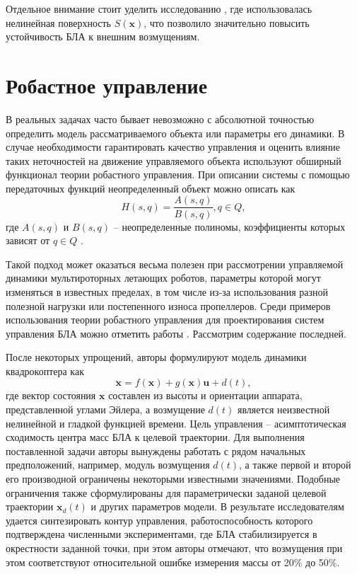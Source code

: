 Отдельное внимание стоит уделить исследованию \cite{Sumantri01}, где использовалась нелинейная поверхность $S(\bm x)$, что позволило значительно повысить устойчивость БЛА к внешним возмущениям.

\section{Робастное управление}

В реальных задачах часто бывает невозможно с абсолютной точностью определить модель рассматриваемого объекта или параметры его динамики.
В случае необходимости гарантировать качество управления и оценить влияние таких неточностей на движение управляемого объекта используют обширный функционал теории робастного управления.
При описании системы с помощью передаточных функций неопределенный объект можно описать как
\begin{equation} \label{eq:robust_ctrl_obj}
H(s, q) = \frac{A(s, q)}{B(s, q)}, q \in Q,
\end{equation}
где $A(s, q)$ и $B(s, q)$ -- неопределенные полиномы, коэффициенты которых зависят от $q \in Q$ \cite{Polyak01}. 

Такой подход может оказаться весьма полезен при рассмотрении управляемой динамики
мультироторных летающих роботов, параметры которой могут изменяться в известных пределах, в том числе из-за использования разной полезной нагрузки или постепенного износа пропеллеров. Среди примеров использования теории робастного управления для проектирования систем управления БЛА можно отметить работы \cite{Lee02, Borisov01, Petranevsky01, Bai01, Tony01}. Рассмотрим содержание последней.

После некоторых упрощений, авторы формулируют модель динамики квадрокоптера как 
\begin{equation} \label{eq:Tony_dyn}
\ddot{\bm x} = f(\bm x) + g( \bm x) \bm u + d(t),
\end{equation}
где вектор состояния $\bm x$ составлен из высоты и ориентации аппарата, представленной углами Эйлера, а возмущение $d(t)$ является неизвестной нелинейной и гладкой функцией времени. Цель управления -- асимптотическая сходимость центра масс БЛА к целевой траектории. Для выполнения поставленной задачи авторы вынуждены работать с рядом начальных предположений, например, модуль возмущения $d(t)$, а также первой и второй его производной ограничены некоторыми известными значениями. Подобные ограничения также сформулированы для параметрически заданой целевой траектории $\bm x_d(t)$ и других параметров модели. В результате исследователям удается синтезировать контур управления, работоспособность которого подтверждена численными экспериментами, где БЛА стабилизируется в окрестности заданной точки, при этом авторы отмечают, что возмущения при этом соответствуют относительной ошибке измерения массы от 20\% до 50\%.

